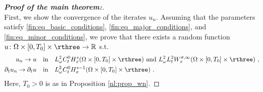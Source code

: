 \documentclass[11pt]{article}
\begin{document}
\begin{proof}[\textbf{Proof of the main theorem:}]~\\
First, we show the convergence of the iterates \( u_n \). Assuming that the parameters satisfy  \eqref{fin:eq_basic_conditions}, \eqref{fin:eq_major_conditions}, and \eqref{fin:eq_minor_conditions}, we prove that there exists a random function \( {u\colon \Omega \times [0,T_0] \times \rthree \rightarrow \mathbb{R} }\) s.t.
\begin{equation}\label{fin:eq_convergence}
\begin{aligned}
u_n \rightarrow u \quad &\text{in} \quad L_\omega ^2 C_t^0 H_x^s(\Omega \times [0,T_0]\times \rthree) ~ \text{and} ~L_\omega^2 L_t^2 W_x^{\sigma,\infty}(\Omega \times [0,T_0]\times \rthree)~,\\
\partial_t u_n \rightarrow \partial_t u \quad &\text{in} \quad  L_\omega ^2 C_t^0 H_x^{s-1}(\Omega \times [0,T_0]\times \rthree) ~. 
\end{aligned}
\end{equation}
Here, \( T_0 > 0 \) is as in Proposition \ref{nl:prop_wn}.


\end{proof}
\end{document}
